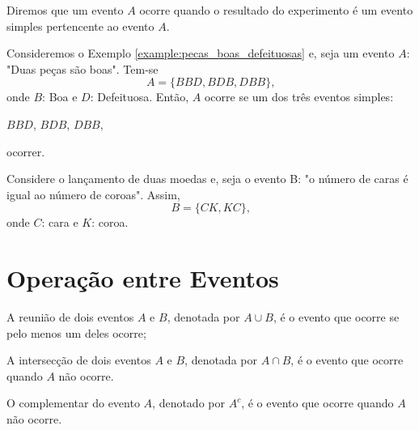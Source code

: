 \documentclass[11pt,fleqn]{book}
\numberwithin{mpicture}{chapter}
\numberwithin{mtable}{chapter}
\numberwithin{mframe}{chapter}
\begin{document}
\begin{remark}
	Diremos que um evento $A$ ocorre quando o resultado do experimento é um evento simples pertencente ao evento $A$.
\end{remark}

\begin{example}
	Consideremos o Exemplo \ref{example:pecas_boas_defeituosas} e, seja um evento $A$: "Duas peças são boas". Tem-se
	\[
		A=\{BBD, BDB, DBB\}\text{,}
	\]
	onde $B$: Boa e $D$: Defeituosa. Então, $A$ ocorre se um dos três eventos simples:
	\begin{center}
		$BBD$, $BDB$, $DBB$,
	\end{center}
	ocorrer.
\end{example}

\begin{example}
	Considere o lançamento de duas moedas e, seja o evento B: "o número de caras é igual ao número de coroas". Assim,
	\[
		B=\{CK, KC\}\text{,}
	\]
	onde $C$: cara e $K$: coroa.
\end{example}

\section{Operação entre Eventos}

\begin{definition}
	\label{def:reuniao_dois_eventos}
	A reunião de dois eventos $A$ e $B$, denotada por $A\cup B$, é o evento que ocorre se pelo menos um deles ocorre;
\end{definition}

\begin{definition}
	\label{def:intercecao_dois_eventos}
	A intersecção de dois eventos $A$ e $B$, denotada por $A\cap B$, é o evento que ocorre quando $A$ não ocorre.
\end{definition}

\begin{definition}
	\label{def:complementar_evento}
	O complementar do evento $A$, denotado por $A^{c}$, é o evento que ocorre quando $A$ não ocorre.
\end{definition}
\end{document}
